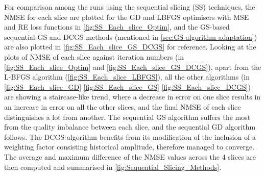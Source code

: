 For comparison among the runs using the sequential slicing (SS) techniques, the NMSE for each slice are plotted for the GD and LBFGS optimisers with MSE and RE loss functions in \cref{fig:SS_Each_slice_Optim}, and the GS-based sequential GS and DCGS \cite{Zhou2019} methods (mentioned in \cref{sec:GS algorithm adaptation}) are also plotted in \cref{fig:SS_Each_slice_GS_DCGS} for reference. Looking at the plots of NMSE of each slice against iteration numbers (in \cref{fig:SS_Each_slice_Optim} and \cref{fig:SS_Each_slice_GS_DCGS}), apart from the L-BFGS algorithm (\cref{fig:SS_Each_slice_LBFGS}), all the other algorithms (in \cref{fig:SS_Each_slice_GD} \cref{fig:SS_Each_slice_GS} \cref{fig:SS_Each_slice_DCGS}) are showing a staircase-like trend, where a decrease in error on one slice results in an increase in error on all the other slices, and the final NMSE of each slice distinguishes a lot from another. The sequential GS algorithm suffers the most from the quality imbalance between each slice, and the sequential GD algorithm follows. The DCGS algorithm benefits from its modification of the inclusion of a weighting factor consisting historical amplitude, therefore managed to converge. The average and maximum difference of the NMSE values across the 4 slices are then computed and summarised in \cref{fig:Sequential_Slicing_Methods}.

